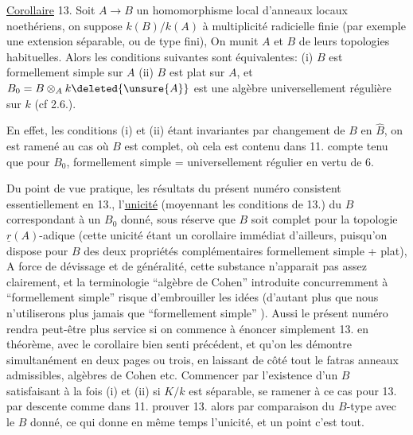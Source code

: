 
\uline{Corollaire} 13. Soit $A\longrightarrow B$ un homomorphisme local d'anneaux locaux
noethériens, on suppose $k(B)/k(A)$ à multiplicité radicielle finie
(par exemple une extension séparable, ou de type fini),
  On
munit $A$ et $B$ de leurs topologies habituelles. Alors les conditions suivantes
sont équivalentes: (i) $B$ est formellement simple sur $A$ (ii) $B$ est
plat sur $A$, et $B_0=B\otimes_A k\deleted{\unsure{A}}$ est une algèbre universellement régulière sur
$k$ (cf 2.6.).

En effet, les conditions (i) et (ii) étant invariantes par changement
de $B$ en $\widehat{B}$, on est ramené au cas où $B$ est complet, où cela est contenu
dans 11.  compte tenu que pour $B_0$, formellement simple = universellement
régulier en vertu de 6.

Du point de vue pratique, les résultats du présent numéro consistent
essentiellement en 13.,  l'\uline{unicité}  (moyennant les conditions
de 13.) du $B$ correspondant à un $B_0$ donné, sous réserve que $B$ soit
complet pour la topologie $\underline{r}(A)$-adique (cette  unicité étant un
corollaire immédiat d'ailleurs, puisqu'on dispose pour $B$ des deux propriétés
complémentaires formellement simple + plat),
A force de dévissage et
de généralité, cette substance n'apparait pas assez clairement, et la
terminologie ``algèbre de Cohen'' introduite concurremment à ``formellement
simple'' risque  d'embrouiller  les idées (d'autant plus que nous
n'utiliserons plus jamais que ``formellement simple'' ). Aussi le présent
numéro rendra peut-être plus service si on commence à énoncer simplement
13. en théorème, avec le corollaire bien senti précédent, et qu'on
les démontre simultanément en deux pages ou trois,  en laissant de
côté tout le fatras anneaux admissibles, algèbres de Cohen etc. Commencer
par l'existence d'un $B$ satisfaisant à la fois (i) et (ii) si $K/k$ est
séparable, se ramener à ce cas pour 13. par descente comme dans 11.
prouver 13. alors par comparaison du $B$-type avec le $B$ donné, ce qui
donne en même temps l'unicité, et un point c'est tout.


